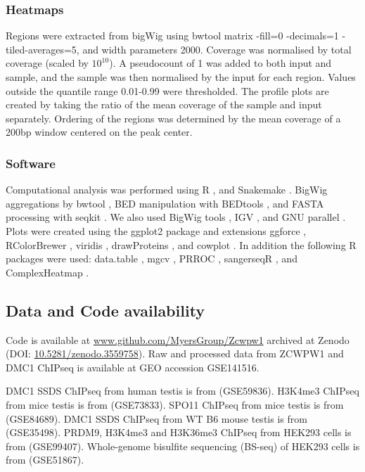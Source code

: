 \subsubsection{Heatmaps}
\label{sec:heatmaps}
Regions were extracted from bigWig using bwtool matrix -fill=0 -decimals=1 -tiled-averages=5, and width parameters 2000.
Coverage was normalised by total coverage (scaled by $10^{10}$).
A pseudocount of 1 was added to both input and sample, and the sample was then normalised by the input for each region.
Values outside the quantile range 0.01-0.99 were thresholded.
The profile plots are created by taking the ratio of the mean coverage of the sample and input separately.
Ordering of the regions was determined by the mean coverage of a 200bp window centered on the peak center.

\subsubsection{Software}
Computational analysis was performed using R \parencite{RCoreTeam2018Language}, and Snakemake \parencite{Koster2012Snakemake}.
BigWig aggregations by bwtool \parencite{Pohl2014bwtool}, BED manipulation with BEDtools \parencite{Quinlan2010BEDTools}, and FASTA processing with seqkit \parencite{Shen2016SeqKit}.
We also used BigWig tools \parencite{Kent2010BigWig}, IGV \parencite{Thorvaldsdottir2013Integrative}, and GNU parallel \parencite{Tange2011GNU}.
Plots were created using the ggplot2 package \parencite{Wickham2016ggplot2} and extensions ggforce \parencite{Pedersen2016ggforce}, RColorBrewer \parencite{Neuwirth2014RColorBrewer}, viridis \parencite{Garnier2018viridis}, drawProteins \parencite{Brennan2018drawProteins}, and cowplot \parencite{Wilke2018cowplot}.
In addition the following R packages were used: data.table \parencite{Dowle2019data}, mgcv \parencite{Wood2011Fast}, PRROC \parencite{Grau2015PRROC}, sangerseqR \parencite{Hill2014Poly}, and ComplexHeatmap \parencite{Gu2016Complex}.

\subsection{Data and Code availability}
Code is available at \url{www.github.com/MyersGroup/Zcwpw1} archived at Zenodo (DOI: \href{http://www.doi.org/10.5281/zenodo.3559758}{10.5281/zenodo.3559758}).
Raw and processed data from ZCWPW1 and DMC1 ChIPseq is available at GEO accession GSE141516.

DMC1 SSDS ChIPseq from human testis is from \parencite{Pratto2014DNA} (GSE59836).
H3K4me3 ChIPseq from mice testis is from \parencite{Davies2016Reengineering} (GSE73833).
SPO11 ChIPseq from mice testis is from \parencite{Lange2016Landscape} (GSE84689).
DMC1 SSDS ChIPseq from WT B6 mouse testis is from \parencite{Brick2012Genetic} (GSE35498).
PRDM9, H3K4me3 and H3K36me3 ChIPseq from HEK293 cells is from \parencite{Altemose2017map} (GSE99407).
Whole-genome bisulfite sequencing (BS-seq) of HEK293 cells is from \parencite{Libertini2015Overexpression} (GSE51867).

